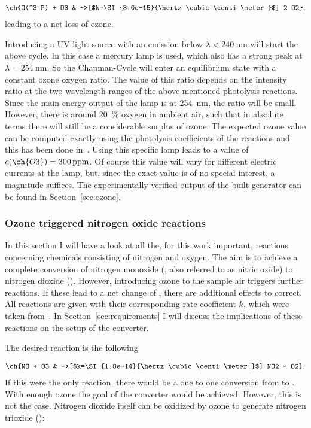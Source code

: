 \begin{align*}
  \ch{O(^3 P) + O3 & ->[$k=\SI{8.0e-15}{\hertz\cubic\centi\meter}$] 2 O2},
\end{align*}
leading to a net loss of ozone. 

Introducing a UV light source with an emission below
$\lambda < \SI{240}{\nano\meter}$ will start the above cycle. In this
case a mercury lamp is used, which also has a strong peak at
$\lambda = \SI{254}{\nano\meter}$. So the Chapman-Cycle will enter an
equilibrium state with a constant ozone oxygen ratio. The value of
this ratio depends on the intensity ratio at the two wavelength ranges
of the above mentioned photolysis reactions. Since the main energy
output of the lamp is at \SI{254}{\nano\meter}, the ratio will be
small. However, there is around \SI{20}{\%} oxygen in ambient air,
such that in absolute terms there will still be a considerable surplus
of ozone. The expected ozone value can be computed exactly using the
photolysis coefficients of the reactions and this has been done
in~\cite{bsc}. Using this specific lamp leads to a value of
$c(\ch{O3}) = \SI{300}{ppm}$. Of course this value will vary for
different electric currents at the lamp, but, since the exact value is
of no special interest, a magnitude suffices. The experimentally
verified output of the built generator can be found in
Section~\ref{sec:ozone}.

\subsubsection{Ozone triggered nitrogen oxide reactions}
\label{sec:o-no}

In this section I will have a look at all the, for this work
important, reactions concerning chemicals consisting of nitrogen and
oxygen. The aim is to achieve a complete conversion of nitrogen
monoxide (, also referred to as nitric oxide) to nitrogen
dioxide (). However, introducing ozone to the sample air
triggers further reactions. If these lead to a net change of ,
there are additional effects to correct. All reactions are given with
their corresponding rate coefficient $k$, which were taken
from~\cite{bsc}. In Section~\ref{sec:requirements} I will discuss the
implications of these reactions on the setup of the converter.

The desired reaction is the following

\begin{align}
  \ch{NO + O3 & ->[$k=\SI{1.8e-14}{\hertz\cubic\centi\meter}$] NO2
                + O2}. \label{eq:no}
\end{align}
If this were the only reaction, there would be a one to one conversion
from  to . With enough ozone the goal of the converter
would be achieved. However, this is not the case. Nitrogen dioxide
itself can be oxidized by ozone to generate nitrogen trioxide
():

